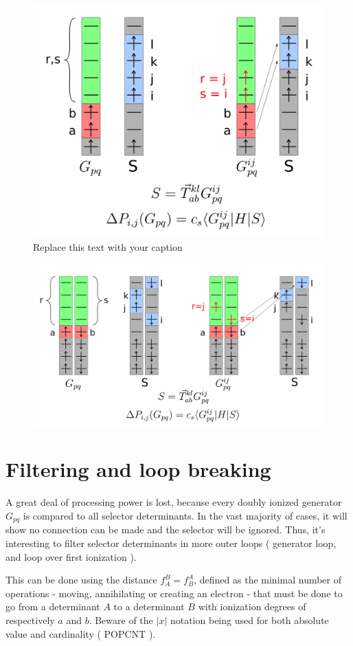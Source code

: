 \documentclass[./thesis.tex]{subfiles}
\begin{document}
\begin{figure}[h!]
	\begin{center}
		\includegraphics[width=0.70\columnwidth]{figures/cipsi/systematic_determination}
		\caption{{Replace this text with your caption%
		}}
	\end{center}
\end{figure}
\begin{figure}[h!]
	\begin{center}
		\includegraphics[width=0.70\columnwidth]{figures/cipsi/systematic_determination2}
		\caption{{\label{splash}%
		}}
	\end{center}
\end{figure}

\section{Filtering and loop breaking}
A great deal of processing power is lost, because every doubly ionized generator $G_{pq}$ is compared to all selector determinants. In the vast majority of cases, it will show no connection can be made and the selector will be ignored. Thus, it's interesting to filter selector determinants in more outer loops ( generator loop, and loop over first ionization ).

This can be done using the distance $f_A^B = f_B^A$, defined as the minimal number of operations - moving, annihilating or creating an electron - that must be done to go from a determinant $A$ to a determinant $B$ with ionization degrees of respectively $a$ and $b$. Beware of the $|x|$ notation being used for both absolute value and cardinality ( POPCNT ).
%
\end{document}
